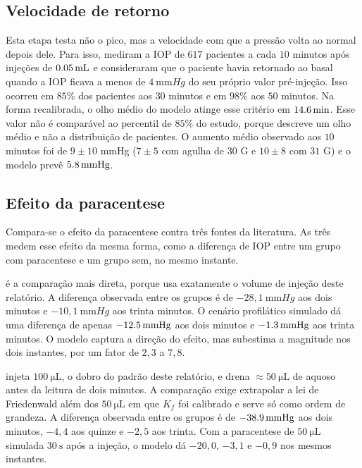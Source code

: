 \subsection{Velocidade de retorno}
 
Esta etapa testa não o pico, mas a velocidade com que a pressão volta ao normal depois dele. Para isso, \citet{lobue2023} mediram a IOP de $617$ pacientes a cada $10$ minutos após injeções de $\SI{0{,}05}{\milli\liter}$ e consideraram que o paciente havia retornado ao basal quando a IOP ficava a menos de $\SI{4}{\milli\meter Hg}$ do seu próprio valor pré-injeção. Isso ocorreu em $85\%$ dos pacientes aos $30$ minutos e em $98\%$ aos $50$ minutos. Na forma recalibrada, o olho médio do modelo atinge esse critério em $\SI{14{,}6}{\minute}$. Esse valor não é comparável ao percentil de $85\%$ do estudo, porque descreve um olho médio e não a distribuição de pacientes. O aumento médio observado aos $10$ minutos foi de $9\pm10$ mmHg ($7\pm5$ com agulha de $30$ G e $10\pm8$ com $31$ G) e o modelo prevê $\SI{5{,}8}{\milli\meter Hg}$.
 
\subsection{Efeito da paracentese}
\label{sec:camada4}

Compara-se o efeito da paracentese contra três fontes da literatura. As três medem esse efeito da mesma forma, como a diferença de IOP entre um grupo com paracentese e um grupo sem, no mesmo instante.
 
\citet{soheilian2017} é a comparação mais direta, porque usa exatamente o volume de injeção deste relatório. A diferença observada entre os grupos é de $-28{,}1\ \unit{\milli\meter Hg}$ aos dois minutos e $-10{,}1\ \unit{\milli\meter Hg}$ aos trinta minutos. O cenário profilático simulado dá uma diferença de apenas $\SI{-12{,}5}{\milli\meter Hg}$ aos dois minutos e $\SI{-1{,}3}{\milli\meter Hg}$ aos trinta minutos. O modelo captura a direção do efeito, mas subestima a magnitude nos dois instantes, por um fator de $2{,}3$ a $7{,}8$.

\citet{changchung2007} injeta $\SI{100}{\micro\liter}$, o dobro do padrão deste relatório, e drena $\approx\SI{50}{\micro\liter}$ de aquoso antes da leitura de dois minutos. A comparação exige extrapolar a lei de Friedenwald além dos $\SI{50}{\micro\liter}$ em que $K_f$ foi calibrado e serve só como ordem de grandeza. A diferença observada entre os grupos é de $\SI{-38{,}9}{\milli\meter Hg}$ aos dois minutos, $-4{,}4$ aos quinze e $-2{,}5$ aos trinta. Com a paracentese de $\SI{50}{\micro\liter}$ simulada $\SI{30}{\second}$ após a injeção, o modelo dá $-20{,}0$, $-3{,}1$ e $-0{,}9$ nos mesmos instantes.
 
